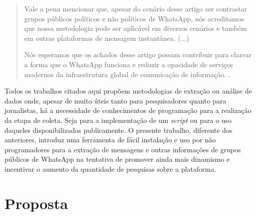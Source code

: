 \begin{quote}
    Vale a pena mencionar que, apesar do cenário desse artigo ser contrastar grupos públicos políticos e não políticos de WhatsApp, nós acreditamos que nossa metodologia pode ser aplicável em diversos cenários e também em outras plataformas de mensagem instantânea. (...)
    
    Nós esperamos que os achados desse artigo possam contribuir para clarear a forma que o WhatsApp funciona e reduzir a opacidade de serviços modernos da infraestrutura global de comunicação de informação.
    \cite[p.~1013, tradução nossa]{caetano2018analyzing}.
    
\end{quote}

Todos os trabalhos citados aqui propõem metodologias de extração ou análise de dados onde, apesar de muito úteis tanto para pesquisadores quanto para jornalistas, há a necessidade de conhecimentos de programação para a realização da etapa de coleta. Seja para a implementação de um \textit{script} ou para o uso daqueles disponibilizados publicamente. O presente trabalho, diferente dos anteriores, introduz uma ferramenta de fácil instalação e uso por não programadores para a extração de mensagens e outras informações de grupos públicos de WhatsApp na tentativa de promover ainda mais dinamismo e incentivar o aumento da quantidade de pesquisas sobre a plataforma.

\section{Proposta}
\label{cap:proposta}



